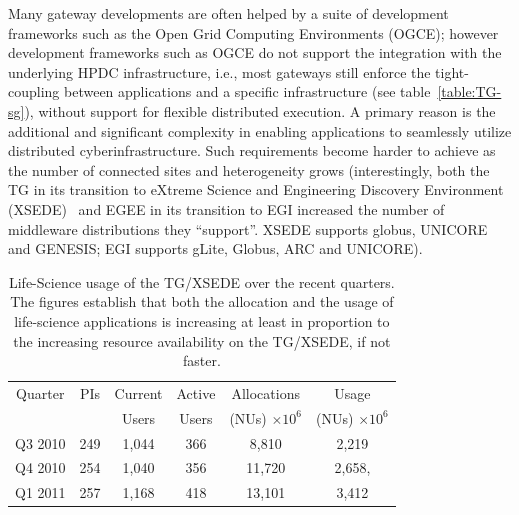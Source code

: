 \documentclass[]{svjour3}
\begin{document}
Many gateway developments are often helped by a suite of development
frameworks such as the Open Grid Computing
Environments\cite{ogce-2010} (OGCE); however development frameworks
such as OGCE do not support the integration with the underlying HPDC
infrastructure, i.e., most gateways still enforce the tight-coupling
between applications and a specific infrastructure (see
table~\ref{table:TG-sg}), without support for flexible distributed
execution.  A primary reason is the additional and significant
complexity in %
enabling applications to seamlessly utilize distributed
cyberinfrastructure. Such requirements become harder to achieve as the
number of connected sites and heterogeneity grows (interestingly, both
the TG in its transition to eXtreme Science and Engineering Discovery
Environment (XSEDE)~\cite{XSEDE} and EGEE in its transition to EGI
increased the number of middleware distributions they ``support''.
XSEDE supports globus, UNICORE and GENESIS; EGI supports gLite,
Globus, ARC and UNICORE).



\begin{table}
\centering
 \small
\begin{tabular}{|c|c|c|c|c|c|} 
  \hline  Quarter & PIs & Current & Active & Allocations  & Usage\\
  & & Users  &  Users & (NUs) $\times 10^6$& (NUs) $\times 10^6$ \\ \hline
  Q3 2010 & 249 & 1,044 & 366 & 8,810   & 2,219  \\ \hline
  Q4 2010 & 254 & 1,040 & 356 & 11,720  & 2,658, \\ \hline
  Q1 2011 & 257 & 1,168 & 418 & 13,101  & 3,412\\ \hline 
\end{tabular} 
\caption{Life-Science usage of the TG/XSEDE over the recent
  quarters. The figures establish that both the  allocation and the
  usage of life-science applications is increasing at least in
  proportion to the increasing resource availability on the TG/XSEDE,
  if not faster.}
 \label{tg2011} 
\end{table}




\end{document}
